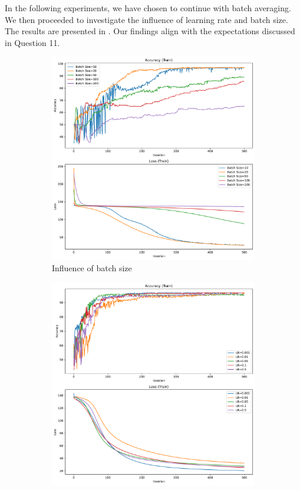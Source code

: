 In the following experiments, we have chosen to continue with batch averaging. We then proceeded to investigate the influence of learning rate and batch size. The results are presented in . Our findings align with the expectations discussed in Question 11.

\begin{figure}[H]
    \centering
    \begin{subfigure}{0.45\textwidth}
        \centering
        \includegraphics[width=\textwidth]{figs/NN/manual_batchsize.pdf}
        \caption{Influence of batch size}
        \label{subfig:manual_batchsize}
    \end{subfigure}
    \begin{subfigure}{0.45\textwidth}
        \centering
        \includegraphics[width=\textwidth]{figs/NN/manual_lr.pdf}

\end{subfigure}
\end{figure}
